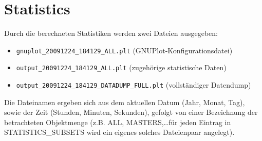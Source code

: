 \documentclass[a4paper,halfparskip,11pt,twoside]{scrartcl}
\begin{document}
\section{Statistics}%
Durch die berechneten Statistiken werden zwei Dateien ausgegeben:

\begin{itemize}
\item \texttt{gnuplot\_20091224\_184129\_ALL.plt} (GNUPlot-Konfigurationsdatei)
\item \texttt{output\_20091224\_184129\_ALL.plt} (zugehörige statistische Daten)
\item \texttt{output\_20091224\_184129\_DATADUMP\_FULL.plt} (vollständiger Datendump)
\end{itemize}

Die Dateinamen ergeben sich aus dem aktuellen Datum (Jahr, Monat, Tag), sowie der Zeit (Stunden, Minuten, Sekunden), gefolgt von einer Bezeichnung der betrachteten Objektmenge (z.B. ALL, MASTERS,\dots für jeden Eintrag in STATISTICS\_SUBSETS wird ein eigenes solches Dateienpaar angelegt).

\newpage
\appendix

	\newpage


\newpage
\thispagestyle{empty}
~
\end{document}
